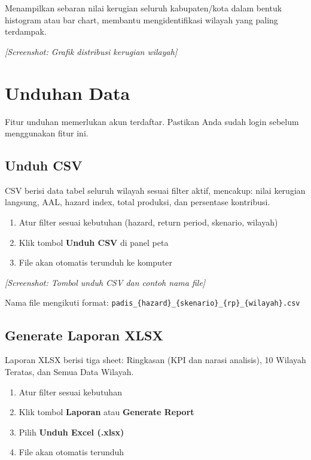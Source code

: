 \documentclass[12pt, a4paper]{article}
\newcommand{\screenshot}[1]{%
    \begin{center}
      \begin{tcolorbox}[
        enhanced,
        colback  = sectiongray,
        colframe = padisborder,
        arc      = 6pt,
        boxrule  = 0.6pt,
        height   = 5.5cm,
        valign   = center,
        halign   = center,
        fontupper = \sffamily\small\color{padismuted},
      ]
        \textit{[Screenshot: #1]}
      \end{tcolorbox}
    \end{center}%
  }
\begin{document}
  Menampilkan sebaran nilai kerugian seluruh kabupaten/kota dalam bentuk histogram atau
  bar chart, membantu mengidentifikasi wilayah yang paling terdampak.

  \screenshot{Grafik distribusi kerugian wilayah}

  \newpage

  \section{Unduhan Data}

  \begin{warnbox}
    Fitur unduhan memerlukan akun terdaftar. Pastikan Anda sudah login sebelum menggunakan
    fitur ini.
  \end{warnbox}

  \subsection{Unduh CSV}

  CSV berisi data tabel seluruh wilayah sesuai filter aktif, mencakup:
  nilai kerugian langsung, AAL, hazard index, total produksi, dan persentase kontribusi.

  \begin{enumerate}
    \item Atur filter sesuai kebutuhan (hazard, return period, skenario, wilayah)
    \item Klik tombol \textbf{Unduh CSV} di panel peta
    \item File akan otomatis terunduh ke komputer
  \end{enumerate}

  \screenshot{Tombol unduh CSV dan contoh nama file}

  Nama file mengikuti format: \texttt{padis\_\{hazard\}\_\{skenario\}\_\{rp\}\_\{wilayah\}.csv}

  \subsection{Generate Laporan XLSX}

  Laporan XLSX berisi tiga sheet: Ringkasan (KPI dan narasi analisis), 10 Wilayah Teratas,
  dan Semua Data Wilayah.

  \begin{enumerate}
    \item Atur filter sesuai kebutuhan
    \item Klik tombol \textbf{Laporan} atau \textbf{Generate Report}
    \item Pilih \textbf{Unduh Excel (.xlsx)}
    \item File akan otomatis terunduh
  \end{enumerate}
\end{document}
